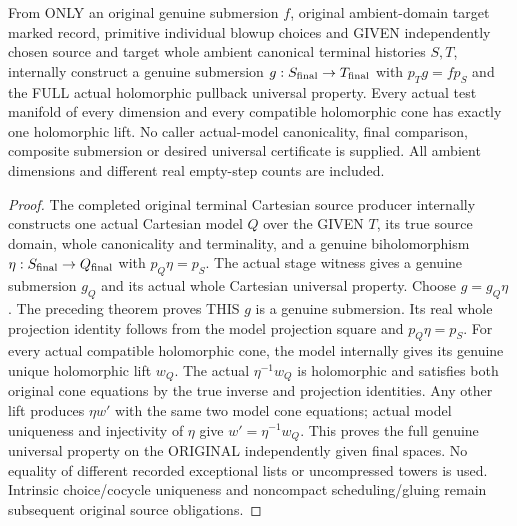 \begin{theorem}
\label{hir:smooth-original-terminal-final-submersion-pullback}
\leanok
{}
From ONLY an original genuine submersion $f$, original ambient-domain
target marked record, primitive individual blowup choices and GIVEN
independently chosen source and target whole ambient canonical terminal
histories $S,T$, internally construct a genuine submersion
$g:S_{\rm final}\to T_{\rm final}$ with $p_Tg=fp_S$ and the FULL actual
holomorphic pullback universal property. Every actual test manifold of
every dimension and every compatible holomorphic cone has exactly one
holomorphic lift. No caller actual-model canonicality, final comparison,
composite submersion or desired universal certificate is supplied. All
ambient dimensions and different real empty-step counts are included.
\end{theorem}
\begin{proof}
The completed original terminal Cartesian source producer internally
constructs one actual Cartesian model $Q$ over the GIVEN $T$, its true
source domain, whole canonicality and terminality, and a genuine
biholomorphism $\eta:S_{\rm final}\to Q_{\rm final}$ with $p_Q\eta=p_S$.
The actual stage witness gives a genuine submersion $g_Q$ and its actual
whole Cartesian universal property. Choose $g=g_Q\eta$. The preceding
theorem proves THIS $g$ is a genuine submersion. Its real whole projection
identity follows from the model projection square and $p_Q\eta=p_S$.
For every actual compatible holomorphic cone, the model internally gives
its genuine unique holomorphic lift $w_Q$. The actual $\eta^{-1}w_Q$ is
holomorphic and satisfies both original cone equations by the true inverse
and projection identities. Any other lift produces $\eta w'$ with the
same two model cone equations; actual model uniqueness and injectivity
of $\eta$ give $w'=\eta^{-1}w_Q$. This proves the full genuine universal
property on the ORIGINAL independently given final spaces. No equality
of different recorded exceptional lists or uncompressed towers is used.
Intrinsic choice/cocycle uniqueness and noncompact scheduling/gluing remain
subsequent original source obligations.
\end{proof}
